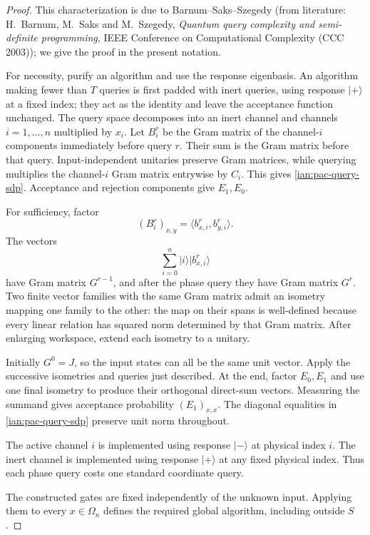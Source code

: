 \begin{proof}
This characterization is due to Barnum--Saks--Szegedy (from literature:
H.~Barnum, M.~Saks and M.~Szegedy, \emph{Quantum query complexity and semi-definite programming},
IEEE Conference on Computational Complexity (CCC 2003)); we give the proof in the present notation.

For necessity, purify an algorithm and use the response eigenbasis.
An algorithm making fewer than \(T\) queries is first padded with inert queries, using response \(|+\rangle\) at a fixed index; they act as the identity and leave the acceptance function unchanged.
The query space decomposes into an inert channel and channels
\(i=1,\ldots,n\) multiplied by \(x_i\).
Let \(B_i^r\) be the Gram matrix of the channel-\(i\) components
immediately before query \(r\). Their sum is the Gram matrix
before that query. Input-independent unitaries preserve Gram
matrices, while querying multiplies the channel-\(i\) Gram matrix
entrywise by \(C_i\). This gives
\eqref{ian:pac-query-sdp}. Acceptance and rejection components
give \(E_1,E_0\).

For sufficiency, factor
\[
 (B_i^r)_{x,y}=\langle b_{x,i}^r,b_{y,i}^r\rangle.
\]
The vectors
\[
 \sum_{i=0}^n |i\rangle|b_{x,i}^r\rangle
\]
have Gram matrix \(G^{r-1}\), and after the phase query they have
Gram matrix \(G^r\).
Two finite vector families with the same Gram matrix admit an
isometry mapping one family to the other: the map on their spans
is well-defined because every linear relation has squared norm
determined by that Gram matrix. After enlarging workspace, extend
each isometry to a unitary.

Initially \(G^0=J\), so the input states can all be the same unit
vector. Apply the successive isometries and queries just described.
At the end, factor \(E_0,E_1\) and use one final isometry to produce
their orthogonal direct-sum vectors. Measuring the summand gives
acceptance probability \((E_1)_{x,x}\).
The diagonal equalities in \eqref{ian:pac-query-sdp} preserve unit
norm throughout.

The active channel \(i\) is implemented using response
\(|-\rangle\) at physical index \(i\).
The inert channel is implemented using response \(|+\rangle\)
at any fixed physical index. Thus each phase query costs one
standard coordinate query.

The constructed gates are fixed independently of the unknown
input. Applying them to every \(x\in\Omega_n\) defines the required
global algorithm, including outside \(S\).
\end{proof}

